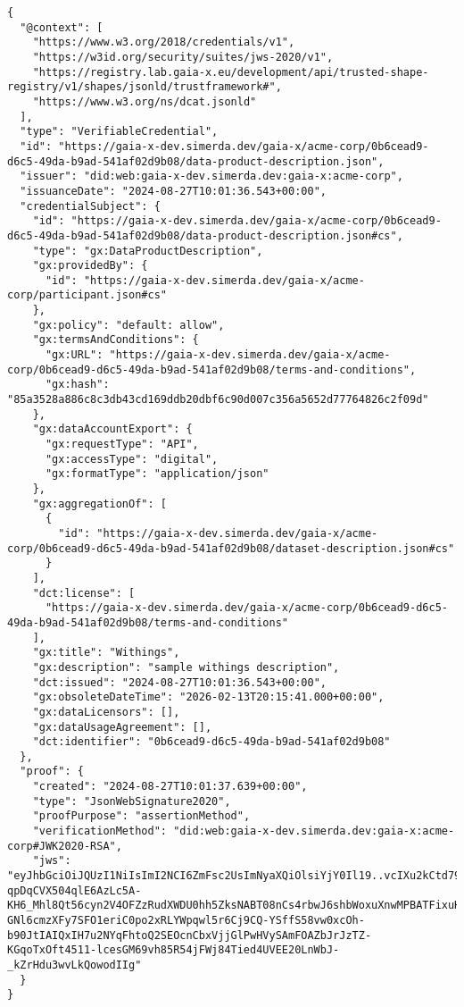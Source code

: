\begin{verbatim}
{
  "@context": [
    "https://www.w3.org/2018/credentials/v1",
    "https://w3id.org/security/suites/jws-2020/v1",
    "https://registry.lab.gaia-x.eu/development/api/trusted-shape-registry/v1/shapes/jsonld/trustframework#",
    "https://www.w3.org/ns/dcat.jsonld"
  ],
  "type": "VerifiableCredential",
  "id": "https://gaia-x-dev.simerda.dev/gaia-x/acme-corp/0b6cead9-d6c5-49da-b9ad-541af02d9b08/data-product-description.json",
  "issuer": "did:web:gaia-x-dev.simerda.dev:gaia-x:acme-corp",
  "issuanceDate": "2024-08-27T10:01:36.543+00:00",
  "credentialSubject": {
    "id": "https://gaia-x-dev.simerda.dev/gaia-x/acme-corp/0b6cead9-d6c5-49da-b9ad-541af02d9b08/data-product-description.json#cs",
    "type": "gx:DataProductDescription",
    "gx:providedBy": {
      "id": "https://gaia-x-dev.simerda.dev/gaia-x/acme-corp/participant.json#cs"
    },
    "gx:policy": "default: allow",
    "gx:termsAndConditions": {
      "gx:URL": "https://gaia-x-dev.simerda.dev/gaia-x/acme-corp/0b6cead9-d6c5-49da-b9ad-541af02d9b08/terms-and-conditions",
      "gx:hash": "85a3528a886c8c3db43cd169ddb20dbf6c90d007c356a5652d77764826c2f09d"
    },
    "gx:dataAccountExport": {
      "gx:requestType": "API",
      "gx:accessType": "digital",
      "gx:formatType": "application/json"
    },
    "gx:aggregationOf": [
      {
        "id": "https://gaia-x-dev.simerda.dev/gaia-x/acme-corp/0b6cead9-d6c5-49da-b9ad-541af02d9b08/dataset-description.json#cs"
      }
    ],
    "dct:license": [
      "https://gaia-x-dev.simerda.dev/gaia-x/acme-corp/0b6cead9-d6c5-49da-b9ad-541af02d9b08/terms-and-conditions"
    ],
    "gx:title": "Withings",
    "gx:description": "sample withings description",
    "dct:issued": "2024-08-27T10:01:36.543+00:00",
    "gx:obsoleteDateTime": "2026-02-13T20:15:41.000+00:00",
    "gx:dataLicensors": [],
    "gx:dataUsageAgreement": [],
    "dct:identifier": "0b6cead9-d6c5-49da-b9ad-541af02d9b08"
  },
  "proof": {
    "created": "2024-08-27T10:01:37.639+00:00",
    "type": "JsonWebSignature2020",
    "proofPurpose": "assertionMethod",
    "verificationMethod": "did:web:gaia-x-dev.simerda.dev:gaia-x:acme-corp#JWK2020-RSA",
    "jws": "eyJhbGciOiJQUzI1NiIsImI2NCI6ZmFsc2UsImNyaXQiOlsiYjY0Il19..vcIXu2kCtd79-qpDqCVX504qlE6AzLc5A-KH6_Mhl8Qt56cyn2V4OFZzRudXWDU0hh5ZksNABT08nCs4rbwJ6shbWoxuXnwMPBATFixuHwgIr4MPOkAybShagjf0zTfkfOgZJPcfwqua0YC1zeQW00hXrDlN-GNl6cmzXFy7SFO1eriC0po2xRLYWpqwl5r6Cj9CQ-YSffS58vw0xcOh-b90JtIAIQxIH7u2NYqFhtoQ2SEOcnCbxVjjGlPwHVySAmFOAZbJrJzTZ-KGqoTxOft4511-lcesGM69vh85R54jFWj84Tied4UVEE20LnWbJ-_kZrHdu3wvLkQowodIIg"
  }
}
\end{verbatim}

